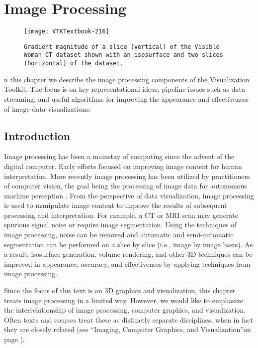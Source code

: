 \chapter{Image Processing}
\label{chap:image_processing}

\begin{figure}[ht]
	\hfill
	\begin{minipage}{0.5\textwidth}
		\centering
		\texttt{[image: VTKTextbook-216]}
		\caption*{\texttt{Gradient magnitude of a slice (vertical) of the Visible Woman CT dataset shown with an isosurface and two slices (horizontal) of the dataset.}}
	\end{minipage}
\end{figure}

n this chapter we describe the image processing components of the Visualization Toolkit.
The focus is on key representational ideas, pipeline issues such as data streaming, and useful algorithms for improving the appearance and effectiveness of image data visualizations.

\section{Introduction}

Image processing has been a mainstay of computing since the advent of the digital computer. Early efforts focused on improving image content for human interpretation. More recently image processing has been utilized by practitioners of computer vision, the goal being the processing of image data for autonomous machine perception \cite{Gonzalez92}. From the perspective of data visualization, image processing is used to manipulate image content to improve the results of subsequent processing and interpretation. For example, a CT or MRI scan may generate spurious signal noise or require image segmentation. Using the techniques of image processing, noise can be removed and automatic and semi-automatic segmentation can be performed on a slice by slice (i.e., image by image basis). As a result, isosurface generation, volume rendering, and other 3D techniques can be improved in appearance, accuracy, and effectiveness by applying techniques from image processing.

Since the focus of this text is on 3D graphics and visualization, this chapter treats image processing in a limited way. However, we would like to emphasize the interrelationship of image processing, computer graphics, and visualization. Often texts and courses treat these as distinctly separate disciplines, when in fact they are closely related (see ``Imaging, Computer Graphics, and Visualization''on page \pageref{sec:imaging_computer_graphics_visualization}).

